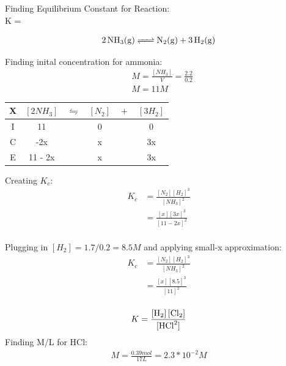 \documentclass{article}  %
\begin{document}
Finding Equilibrium Constant for Reaction: \\
K = 

\begin{equation*}
    \begin{aligned}
        \ce{2NH3_(g) <=> N2_(g) + 3H2_(g)}
    \end{aligned}
\end{equation*}

Finding inital concentration for ammonia:
\begin{equation*}
    \begin{aligned}
        &M = \frac{[NH_3]}{V} = \frac{2.2}{0.2} \\
        &M = 11M
    \end{aligned}
\end{equation*}

\begin{tabular}{c|c@{}c@{}c@{}c@{}c}
    \hline
    X   &   $[2NH_3]$ & ${}\leftrightharpoons{}$ & $[N_2]$ & ${}+{}$ & $[3H_2]$\\
    \hline
    I   & 11          &&   0                           &&  0       \\
    C   & -2x         &&   x                           &&  3x      \\
    E   & 11 - 2x     &&   x                           &&  3x      \\
    \hline
\end{tabular}

Creating $K_c$:
\begin{equation*}
    \begin{aligned}
        K_c &= \frac{[N_2][H_2]^3}{[NH_3]^2} \\
            &= \frac{[x][3x]^3}{[11-2x]^2} \\
    \end{aligned}
\end{equation*}

Plugging in $[H_2] = 1.7/0.2 = 8.5M$ and applying small-x approximation:
\begin{equation*}
    \begin{aligned}
        K_c &= \frac{[N_2][H_2]^3}{[NH_3]^2} \\
            &= \frac{[x][8.5]^3}{[11]^2} \\
    \end{aligned}
\end{equation*}

\begin{equation*}
    \begin{aligned}
        K = \ce{\frac{[H_2] [Cl_2]}{[HCl^2]}}
    \end{aligned}
\end{equation*}
Finding M/L for HCl:
\begin{equation*}
    \begin{aligned}
        M = \frac{0.39mol}{17L} = 2.3*10^{-2}M
    \end{aligned}
\end{equation*}
\end{document}
